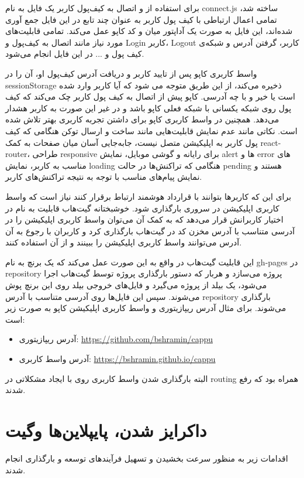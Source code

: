 برای استفاده از
و اتصال به کیف‌پول کاربر یک فایل به نام connect.js ساخته شد، تمامی اعمال ارتباطی با کیف پول کاربر به عنوان چند تابع در این فایل جمع آوری شده‌اند، این فایل به صورت یک آداپتور میان
و کد کاپو عمل می‌کند. تمامی قابلیت‌های مورد نیاز مانند اتصال به کیف‌پول و
\gls{Login}
کاربر،
\gls{Logout}
کاربر، گرفتن آدرس و شبکه‌ی کیف پول و ... در این فایل انجام می‌شود.

واسط کاربری کاپو پس از تایید کاربر و دریافت آدرس کیف‌پول او، آن را در sessionStorage ذخیره می‌کند، از این طریق متوجه می شود که آیا کاربر وارد شده است یا خیر و با چه آدرسی. کاپو پیش از اتصال به کیف پول کاربر چک می‌کند که کیف پول روی شبکه یکسانی با شبکه فعلی کاپو باشد و در غیر این صورت به کاربر هشدار می‌دهد. همچنین در واسط کاربری کاپو برای داشتن تجربه کاربری بهتر تلاش شده است. نکاتی مانند عدم نمایش قابلیت‌هایی مانند ساخت و ارسال توکن هنگامی که کیف پول کاربر به اپلیکیشن متصل نیست، جابه‌جایی آسان میان صفحات به کمک react-router، طراحی responsive برای رایانه و گوشی موبایل، نمایش alert ها و error های مناسب به کاربر، نمایش loading هنگامی که تراکنش‌ها در حالت pending هستند و نمایش پیام‌های مناسب با توجه به نتیجه تراکنش‌های کاربر.

برای این که کاربرها بتوانند با قرارداد هوشمند ارتباط برقرار کنند نیاز است که واسط کاربری اپلیکیشن در سروری بارگذاری شود. خوشبختانه گیت‌هاب قابلیت به نام
در اختیار کاربرانش قرار می‌دهد که به کمک آن می‌توان واسط کاربری اپلیکیشن را در آدرسی متناسب با آدرس مخزن کد در گیت‌هاب بارگذاری کرد و کاربران با رجوع به آن آدرس می‌توانند واسط کاربری اپلیکیشن را ببینند و از آن استفاده کنند.

این قابلیت گیت‌هاب در واقع به این صورت عمل می‌کند که یک برنچ به نام gh-pages در repository پروژه می‌سازد و هربار که دستور بارگذاری پروژه توسط گیت‌هاب اجرا می‌شود، یک بیلد از پروژه می‌گیرد و فایل‌های خروجی بیلد روی این برنچ پوش می‌شوند. سپس این فایل‌ها روی آدرسی متناسب با آدرس repository بارگذاری می‌شوند. برای مثال آدرس ریپازیتوری و واسط کاربری اپلیکیشن کاپو به صورت زیر است:
\begin{itemize}
  \item
  آدرس ریپازیتوری: \url{https://github.com/bshramin/cappu}
  \item
  آدرس واسط کاربری: \url{https://bshramin.github.io/cappu}
\end{itemize}
البته بارگذاری شدن واسط کاربری روی
با ایجاد مشکلاتی در routing همراه بود که رفع شدند.


\section{داکرایز شدن، پایپلاین‌ها وگیت}
اقدامات زیر به منظور سرعت بخشیدن و تسهیل فرآیندهای توسعه و بارگذاری انجام شدند.

